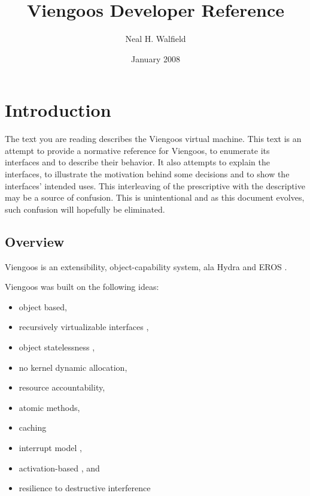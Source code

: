 \documentclass[12pt,a4paper]{book}
\title{Viengoos Developer Reference}
\author{Neal H. Walfield}
\date{January 2008}
\begin{document}
\frontmatter
\maketitle
\tableofcontents

\mainmatter

\setlength{\parindent}{0pt}
\setlength{\parskip}{1ex plus 0.5ex minus 0.2ex}

\chapter{Introduction}

The text you are reading describes the Viengoos virtual machine.  This
text is an attempt to provide a normative reference for Viengoos, to
enumerate its interfaces and to describe their behavior.  It also
attempts to explain the interfaces, to illustrate the motivation
behind some decisions and to show the interfaces' intended uses.  This
interleaving of the prescriptive with the descriptive may be a source
of confusion.  This is unintentional and as this document evolves,
such confusion will hopefully be eliminated.

\section{Overview}

Viengoos is an extensibility, object-capability system, ala Hydra
\cite{wulf74hydra} and EROS \cite{shapiro99eros}.  

Viengoos was built on the following ideas:

\begin{itemize}
\item object based,
\item recursively virtualizable interfaces \cite{popek74requirements-for-virtualizable-architectures},
\item object statelessness \cite{tullmann96userlevel-checkpointing-through-exportable-kernel-state},
\item no kernel dynamic allocation,
\item resource accountability,
\item atomic methods,
\item caching \cite{cheriton94caching-model-of-os-kernel-functionality}
\item interrupt model \cite{ford99interface-and-execution-models},
\item activation-based \cite{roscoe95structure-of-a-multi-service-os}, and
\item resilience to destructive interference \cite{miller06robust-composition}
\end{itemize}
\end{document}
